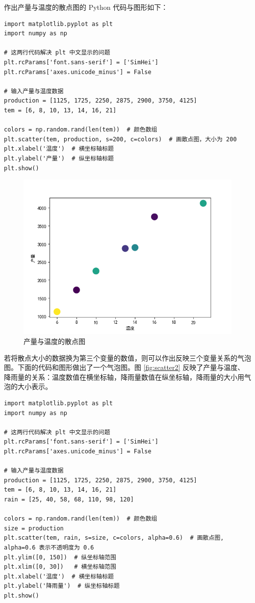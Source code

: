 作出产量与温度的散点图的 Python 代码与图形如下：
\begin{lstlisting}[Language=Python]
import matplotlib.pyplot as plt
import numpy as np

# 这两行代码解决 plt 中文显示的问题
plt.rcParams['font.sans-serif'] = ['SimHei']
plt.rcParams['axes.unicode_minus'] = False

# 输入产量与温度数据
production = [1125, 1725, 2250, 2875, 2900, 3750, 4125]
tem = [6, 8, 10, 13, 14, 16, 21]

colors = np.random.rand(len(tem))  # 颜色数组
plt.scatter(tem, production, s=200, c=colors)  # 画散点图，大小为 200
plt.xlabel('温度')  # 横坐标轴标题
plt.ylabel('产量')  # 纵坐标轴标题
plt.show()
\end{lstlisting}

\begin{figure}[!ht]
  \centering
  \includegraphics{figure/scatter1.png}
  \caption{产量与温度的散点图}
\end{figure}

若将散点大小的数据换为第三个变量的数值，则可以作出反映三个变量关系的气泡图。下面的代码和图形做出了一个气泡图。图 \ref{fig:scatter2} 反映了产量与温度、降雨量的关系：温度数值在横坐标轴，降雨量数值在纵坐标轴，降雨量的大小用气泡的大小表示。

\begin{lstlisting}[Language=Python]
import matplotlib.pyplot as plt
import numpy as np

# 这两行代码解决 plt 中文显示的问题
plt.rcParams['font.sans-serif'] = ['SimHei']
plt.rcParams['axes.unicode_minus'] = False

# 输入产量与温度数据
production = [1125, 1725, 2250, 2875, 2900, 3750, 4125]
tem = [6, 8, 10, 13, 14, 16, 21]
rain = [25, 40, 58, 68, 110, 98, 120]

colors = np.random.rand(len(tem))  # 颜色数组
size = production
plt.scatter(tem, rain, s=size, c=colors, alpha=0.6)  # 画散点图, alpha=0.6 表示不透明度为 0.6
plt.ylim([0, 150])  # 纵坐标轴范围
plt.xlim([0, 30])   # 横坐标轴范围
plt.xlabel('温度')  # 横坐标轴标题
plt.ylabel('降雨量')  # 纵坐标轴标题
plt.show()
\end{lstlisting}

